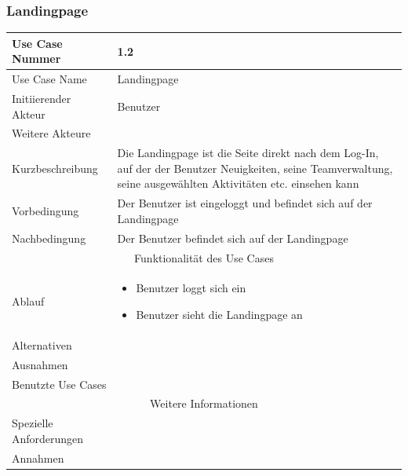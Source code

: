 \documentclass[10pt,a4paper]{article}
\begin{document}
		\subsubsection{Landingpage}
		\begin{tabularx}{\textwidth}{|l|X|}
			\hline Use Case Nummer & 1.2 \\ 
			\hline Use Case Name & Landingpage \\ 
			\hline Initiierender Akteur & Benutzer \\
			\hline Weitere Akteure &  \\
			\hline Kurzbeschreibung & Die Landingpage ist die Seite direkt nach dem Log-In, auf der der Benutzer Neuigkeiten, seine Teamverwaltung, seine ausgewählten Aktivitäten etc. einsehen kann \\
			\hline Vorbedingung & Der Benutzer ist eingeloggt und befindet sich auf der Landingpage \\
			\hline Nachbedingung & Der Benutzer befindet sich auf der Landingpage \\
			\hline \multicolumn{2}{|c|}{Funktionalität des Use Cases}\\
			\hline Ablauf & \begin{itemize}
				\item Benutzer loggt sich ein
				\item Benutzer sieht die Landingpage an
			\end{itemize} \\
			\hline Alternativen & \\
			\hline Ausnahmen & \\
			\hline Benutzte Use Cases & \\
			\hline \multicolumn{2}{|c|}{Weitere Informationen} \\
			\hline Spezielle Anforderungen & \\
			\hline Annahmen & \\
			\hline
		\end{tabularx}
		
\end{document}
